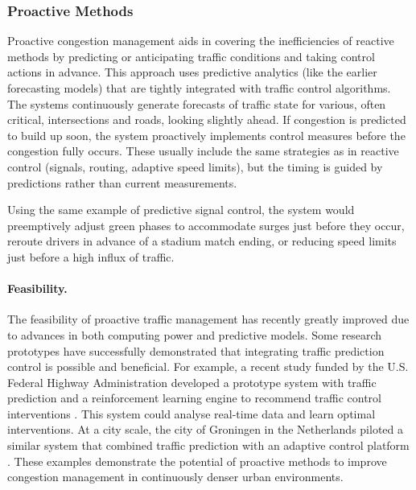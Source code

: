 \subsubsection{Proactive Methods}
Proactive congestion management aids in covering the inefficiencies of reactive methods by predicting or anticipating traffic conditions and taking control actions in advance. This approach uses predictive analytics (like the earlier forecasting models) that are tightly integrated with traffic control algorithms. The systems continuously generate forecasts of traffic state for various, often critical, intersections and roads, looking slightly ahead. If congestion is predicted to build up soon, the system proactively implements control measures before the congestion fully occurs. These usually include the same strategies as in reactive control (signals, routing, adaptive speed limits), but the timing is guided by predictions rather than current measurements.

Using the same example of predictive signal control, the system would preemptively adjust green phases to accommodate surges just before they occur, reroute drivers in advance of a stadium match ending, or reducing speed limits just before a high influx of traffic.

\paragraph{Feasibility.} The feasibility of proactive traffic management has recently greatly improved due to advances in both computing power and predictive models. Some research prototypes have successfully demonstrated that integrating traffic prediction control is possible and beneficial. For example, a recent study funded by the U.S. Federal Highway Administration developed a prototype system with traffic prediction and a reinforcement learning engine to recommend traffic control interventions \cite{us_department_of_transportation_federal_highway_administration_predictive_nodate}. This system could analyse real-time data and learn optimal interventions. At a city scale, the city of Groningen in the Netherlands piloted a similar system that combined traffic prediction with an adaptive control platform \cite{noauthor_predictive_nodate}. These examples demonstrate the potential of proactive methods to improve congestion management in continuously denser urban environments.

